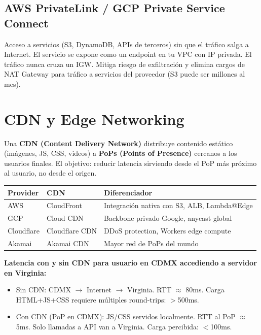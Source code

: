 \subsection{AWS PrivateLink / GCP Private Service Connect}

\begin{moderno}
 Acceso a servicios (S3, DynamoDB, APIs de terceros) sin que el tráfico
salga a Internet. El servicio se expone como un endpoint en tu VPC con IP privada.
El tráfico nunca cruza un IGW. Mitiga riesgo de exfiltración y elimina cargos de
NAT Gateway para tráfico a servicios del proveedor (S3 puede ser millones al mes).
\end{moderno}

\section{ CDN y Edge Networking}

\begin{concepto}
Una \textbf{CDN (Content Delivery Network)} distribuye contenido estático (imágenes,
JS, CSS, videos) a \textbf{PoPs (Points of Presence)} cercanos a los usuarios finales.
El objetivo: reducir latencia sirviendo desde el PoP más próximo al usuario, no desde
el origen.
\end{concepto}

\begin{center}
\begin{tabular}{lll}
\toprule
\textbf{Provider} & \textbf{CDN} & \textbf{Diferenciador} \\
\midrule
AWS         & CloudFront     & Integración nativa con S3, ALB, Lambda@Edge \\
GCP         & Cloud CDN      & Backbone privado Google, anycast global \\
Cloudflare  & Cloudflare CDN & DDoS protection, Workers edge compute \\
Akamai      & Akamai CDN     & Mayor red de PoPs del mundo \\
\bottomrule
\end{tabular}
\end{center}

\begin{ejemplo}
\textbf{Latencia con y sin CDN para usuario en CDMX accediendo a servidor en Virginia:}
\begin{itemize}
    \item Sin CDN: CDMX $\to$ Internet $\to$ Virginia. RTT $\approx$ 80ms. Carga HTML+JS+CSS
          requiere múltiples round-trips: $>$500ms.
    \item Con CDN (PoP en CDMX): JS/CSS servidos localmente. RTT al PoP $\approx$ 5ms.
          Solo llamadas a API van a Virginia. Carga percibida: $<$100ms.
\end{itemize}
\end{ejemplo}
